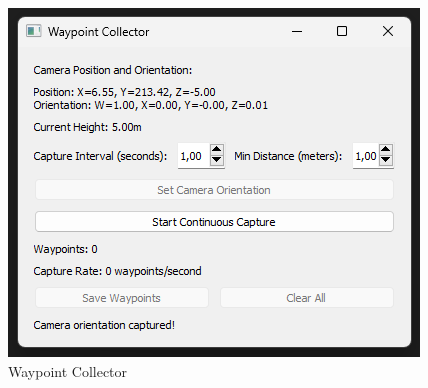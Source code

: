 \documentclass[../report.tex]{subfiles}
\begin{document}
    \begin{figure}
        \centering
        \includegraphics[width=0.5\linewidth]{figures/waypoint_collector.png}
        \caption{Waypoint Collector}
        \label{fig:enter-label}
    \end{figure}
    
\end{document}
